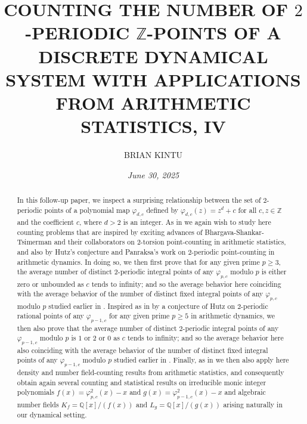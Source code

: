 \documentclass{article}
\title{\textbf{\small{COUNTING THE NUMBER OF $2$-PERIODIC $\mathbb{Z}$-POINTS OF A DISCRETE DYNAMICAL SYSTEM WITH APPLICATIONS FROM ARITHMETIC STATISTICS, IV}}}
\author{\footnotesize{BRIAN KINTU}}
\date{\small{\textit{June 30, 2025}}}
\theoremstyle{plain}
\theoremstyle{definition}
\begin{document}
\maketitle
\begin{abstract}
\small{In this follow-up paper, we inspect a surprising relationship between the set of $2$-periodic points of a polynomial map $\varphi_{d, c}$ defined by $\varphi_{d, c}(z) = z^d + c$ for all $c, z \in \mathbb{Z}$ and the coefficient $c$, where $d>2$ is an integer. As in \cite{BK1} we again wish to study here counting problems that are inspired by exciting advances of Bhargava-Shankar-Tsimerman and their collaborators on $2$-torsion point-counting in arithmetic statistics, and also by Hutz's conjecture and Panraksa's work on $2$-periodic point-counting in arithmetic dynamics. In doing so, we then first prove that for any given prime $p\geq 3$, the average number of distinct $2$-periodic integral points of any $\varphi_{p, c}$ modulo $p$ is either zero or unbounded as $c$ tends to infinity; and so the average behavior here coinciding with the average behavior of the number of distinct fixed integral points of any $\varphi_{p, c}$ modulo $p$ studied earlier in \cite{BK3}. Inspired as in \cite{BK1} by a conjecture of Hutz on $2$-periodic rational points of any $\varphi_{p-1, c}$ for any given prime $p\geq 5$ in arithmetic dynamics, we then also prove that the average number of distinct $2$-periodic integral points of any $\varphi_{p-1, c}$ modulo $p$ is $1$ or $2$ or $0$ as $c$ tends to infinity; and so the average behavior here also coinciding with the average behavior of the number of distinct fixed integral points of any $\varphi_{p-1, c}$ modulo $p$ studied earlier in \cite{BK1}. Finally, as in \cite{BK1} we then also apply here density and number field-counting results from arithmetic statistics, and consequently obtain again several counting and statistical results on irreducible monic integer polynomials $f(x)=\varphi_{p,c}^2(x)-x$ and $g(x)=\varphi_{p-1,c}^2(x)-x$ and algebraic number fields $K_{f}=\mathbb{Q}[x]\slash (f(x))$ and $L_{g}=\mathbb{Q}[x]\slash (g(x))$ arising naturally in our dynamical setting.}
\end{abstract}
\end{document}
